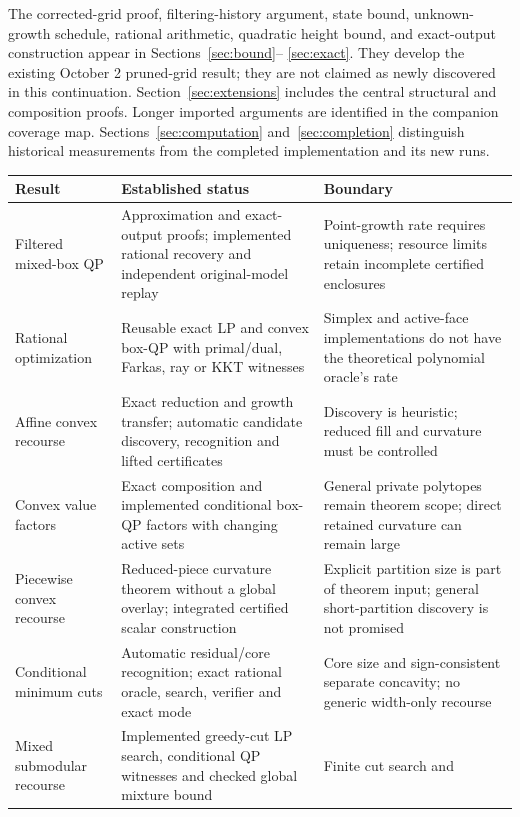The corrected-grid proof, filtering-history argument, state bound,
unknown-growth schedule, rational arithmetic, quadratic height bound,
and exact-output construction appear in Sections~\ref{sec:bound}--
\ref{sec:exact}. They develop the existing October 2 pruned-grid result;
they are not claimed as newly discovered in this continuation.
Section~\ref{sec:extensions} includes the central structural and
composition proofs. Longer imported arguments are identified in the
companion coverage map. Sections~\ref{sec:computation}
and~\ref{sec:completion} distinguish historical measurements from the
completed implementation and its new runs.

\begin{longtable}{@{}>{\raggedright\arraybackslash}p{}
>{\raggedright\arraybackslash}p{}
>{\raggedright\arraybackslash}p{}@{}}
\toprule
Result & Established status & Boundary \\
\midrule
\endhead
Filtered mixed-box QP & Approximation and exact-output proofs;
implemented rational recovery and independent original-model replay &
Point-growth rate requires uniqueness; resource limits retain incomplete
certified enclosures \\
Rational optimization & Reusable exact LP and convex box-QP with
primal/dual, Farkas, ray or KKT witnesses & Simplex and active-face
implementations do not have the theoretical polynomial oracle's rate \\
Affine convex recourse & Exact reduction and growth transfer;
automatic candidate discovery, recognition and lifted certificates &
Discovery is heuristic; reduced fill and curvature must be controlled \\
Convex value factors & Exact composition and implemented conditional
box-QP factors with changing active sets & General private polytopes remain
theorem scope; direct retained curvature can remain large \\
Piecewise convex recourse & Reduced-piece curvature theorem without
a global overlay; integrated certified scalar construction & Explicit partition
size is part of theorem input; general short-partition discovery is not
promised \\
Conditional minimum cuts & Automatic residual/core recognition;
exact rational oracle, search, verifier and exact mode & Core size and
sign-consistent separate concavity; no generic width-only recourse \\
Mixed submodular recourse & Implemented greedy-cut LP search, conditional
QP witnesses and checked global mixture bound & Finite cut search and

\end{longtable}

